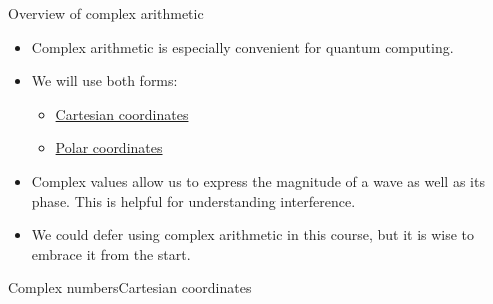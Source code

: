 \begin{frame}{Overview of complex arithmetic}
\begin{itemize}
    \item Complex arithmetic is especially convenient for quantum computing.
    \item We will use both forms:
    \begin{itemize}
        \item \href{https://en.wikipedia.org/wiki/Cartesian_coordinate_system}{Cartesian coordinates}
        \item \href{https://en.wikipedia.org/wiki/Polar_coordinate_system}{Polar coordinates}
    \end{itemize}
    \item Complex values allow us to express the magnitude of a wave as well as its phase.  This is helpful for understanding interference.
    \item We could defer using complex arithmetic in this course, but it is wise to embrace it from the start.
\end{itemize}
\end{frame}

\begin{frame}{Complex numbers}{Cartesian coordinates}
  
\end{frame}

